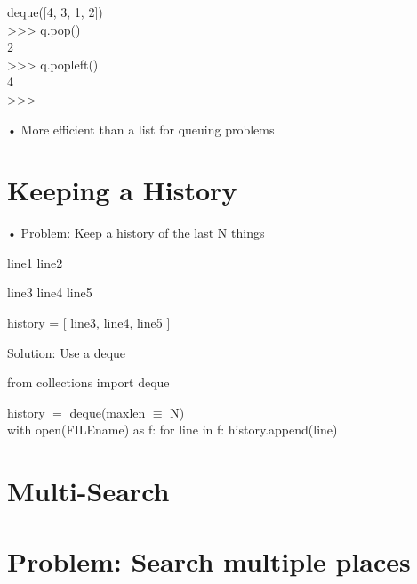 \documentclass[
  letterpaper,
  DIV=11,
  numbers=noendperiod]{scrreprt}
\newenvironment{Shaded}{\begin{snugshade}}{\end{snugshade}}
\newcommand{\NormalTok}[1]{\textcolor[rgb]{0.00,0.23,0.31}{#1}}
\begin{document}
deque({[}4, 3, 1, 2{]})\\
\textgreater\textgreater\textgreater{} q.pop()\\
2\\
\textgreater\textgreater\textgreater{} q.popleft()\\
4\\
\textgreater\textgreater\textgreater{}

• More efficient than a list for queuing problems


\chapter{Keeping a History}\label{keeping-a-history}

• Problem: Keep a history of the last N things

\begin{Shaded}
\begin{Highlighting}[]
\NormalTok{line1 line2 }
\end{Highlighting}
\end{Shaded}

\begin{Shaded}
\begin{Highlighting}[]
\NormalTok{line3 line4 line5 }
\end{Highlighting}
\end{Shaded}

\begin{Shaded}
\begin{Highlighting}[]
\NormalTok{history = [ line3, line4, line5 ] }
\end{Highlighting}
\end{Shaded}

Solution: Use a deque

from collections import deque

history \(=\) deque(maxlen \(\equiv\) N)\\
with open(FILEname) as f: for line in f: history.append(line)


\chapter{Multi-Search}\label{multi-search}


\chapter{Problem: Search multiple
places}\label{problem-search-multiple-places}
\end{document}
